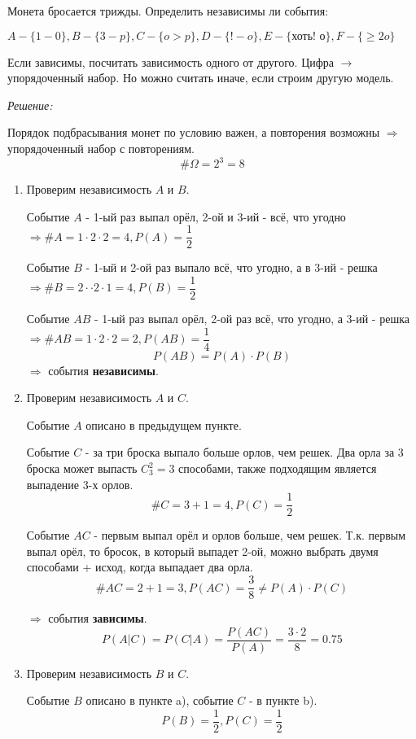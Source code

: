Монета бросается трижды. Определить независимы ли события: 

$A - \{1 - 0\}, B - \{3 - p\}, C - \{o > p\}, D - \{! - o\}, E - \{\text{хоть! о}\}, F - \{\ge 2 o\}$

Если зависимы, посчитать зависимость одного от другого. Цифра $\to$ упорядоченный набор. Но можно считать иначе, если строим другую модель.

\textit{Решение:}

Порядок подбрасывания монет по условию важен, а повторения возможны $\Rightarrow$ упорядоченный набор с повторениям.
\[ \# \Omega = 2^3 = 8 \]

\begin{enumerate}[label=\alph*)]
	\item Проверим независимость $A$ и $B$.
	
	Событие $A$ - 1-ый раз выпал орёл, 2-ой и 3-ий - всё, что угодно $\Rightarrow \# A = 1 \cdot 2 \cdot 2 = 4, P(A) = \dfrac{1}{2}$
	
	Событие $B$ - 1-ый и 2-ой раз выпало всё, что угодно, а в 3-ий - решка $\Rightarrow \# B = 2 \cdot \cdot 2 \cdot 1 = 4, P(B) = \dfrac{1}{2}$
	
	Событие $AB$ - 1-ый раз выпал орёл, 2-ой раз всё, что угодно, а 3-ий - решка $\Rightarrow \# AB = 1 \cdot 2 \cdot 2 = 2, P(AB) = \dfrac{1}{4}$
	\[ P(AB) = P(A) \cdot P(B) \]
	$\Rightarrow$ события \textbf{независимы}.
	
	\item Проверим независимость $A$ и $C$.
	
	Событие $A$ описано в предыдущем пункте.
	
	Событие $C$ - за три броска выпало больше орлов, чем решек. Два орла за 3 броска может выпасть $C_3^2 = 3$ способами, также подходящим является выпадение 3-х орлов.
	\[ \# C = 3 + 1 = 4, P(C) = \dfrac{1}{2} \]
	
	Событие $AC$ - первым выпал орёл и орлов больше, чем решек. Т.к. первым выпал орёл, то бросок, в который выпадет 2-ой, можно выбрать двумя способами + исход, когда выпадает два орла.
	\[ \# AC = 2 + 1 = 3, P(AC) = \dfrac{3}{8} \ne P(A) \cdot P(C) \]
	
	$\Rightarrow$ события \textbf{зависимы}.
	\[ P(A|C) = P(C|A) = \dfrac{P(AC)}{P(A)} = \dfrac{3 \cdot 2}{8} = 0.75 \]
	
	\item Проверим независимость $B$ и $C$.
	
	Событие $B$ описано в пункте a), событие $C$ - в пункте b).
	\[ P(B) = \dfrac{1}{2}, P(C) = \dfrac{1}{2} \]
	

\end{enumerate}
